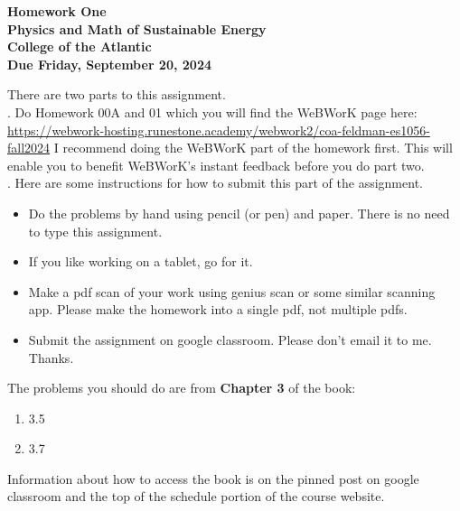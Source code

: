 \documentclass[12pt]{article}
\begin{document}
\pagestyle{empty}
 
\begin{center}
{\LARGE {\bf Homework One}}\\
\bigskip
{\Large {\bf Physics and Math of Sustainable Energy}}\\
\bigskip
{\Large {\bf College of the Atlantic}}\\
\bigskip
{ {\bf Due Friday, September 20, 2024}}\\ 
\end{center}
\medskip


\noindent There are two parts to this assignment.\\

.  Do Homework 00A and 01 which you
will find the WeBWorK page here:
\url{https://webwork-hosting.runestone.academy/webwork2/coa-feldman-es1056-fall2024}
I recommend doing the WeBWorK part of the homework first.  This will
enable you to benefit WeBWorK's instant feedback before you do part
two.\\ 


.  Here are some
instructions for how to submit this part of the assignment.
\begin{itemize}
\item Do the problems by hand using pencil (or pen) and paper.
  There is no need to type this assignment.
\item If you like working on a tablet, go for it. 
\item Make a pdf scan of your work using genius scan or some
  similar scanning app.  Please make the homework into a single
  pdf, not multiple pdfs.
\item Submit the assignment on google classroom.  Please don't
  email it to me. Thanks.\\
\end{itemize}

\noindent The problems you should do are from {\bf Chapter 3} of the
book:  

\begin{enumerate}
\setlength{\itemsep}{-1mm}
  \item 3.5
  \item 3.7\\
\end{enumerate}

\noindent Information about how to access the book is on the
pinned post on google classroom and the top of the schedule portion of
the course website.  
\end{document}
